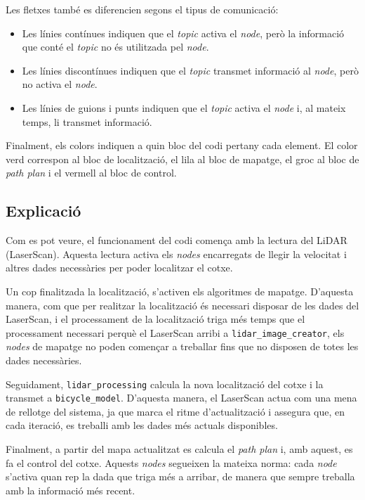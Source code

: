 \documentclass[11pt,a4paper]{article}
\begin{document}
Les fletxes també es diferencien segons el tipus de comunicació:
\nopagebreak

\begin{itemize}
  \item Les línies contínues indiquen que el \emph{topic} activa el \emph{node}, però la informació que conté el \emph{topic} no és utilitzada pel \emph{node}.
  \item Les línies discontínues indiquen que el \emph{topic} transmet informació al \emph{node}, però no activa el \emph{node}.
  \item Les línies de guions i punts indiquen que el \emph{topic} activa el \emph{node} i, al mateix temps, li transmet informació.
\end{itemize}

Finalment, els colors indiquen a quin bloc del codi pertany cada element. El color verd correspon al bloc de localització, el lila al bloc de mapatge, el groc al bloc de \emph{path plan} i el vermell al bloc de control.

\subsection{Explicació}

Com es pot veure, el funcionament del codi comença amb la lectura del LiDAR (LaserScan). Aquesta lectura activa els \emph{nodes} encarregats de llegir la velocitat i altres dades necessàries per poder localitzar el cotxe.

Un cop finalitzada la localització, s’activen els algoritmes de mapatge. D’aquesta manera, com que per realitzar la localització és necessari disposar de les dades del LaserScan, i el processament de la localització triga més temps que el processament necessari perquè el LaserScan arribi a \texttt{lidar\_\allowbreak{}image\_\allowbreak{}creator}, els \emph{nodes} de mapatge no poden començar a treballar fins que no disposen de totes les dades necessàries.

Seguidament, \texttt{lidar\_\allowbreak{}processing} calcula la nova localització del cotxe i la transmet a \texttt{bicycle\_\allowbreak{}model}. D’aquesta manera, el LaserScan actua com una mena de rellotge del sistema, ja que marca el ritme d’actualització i assegura que, en cada iteració, es treballi amb les dades més actuals disponibles.

Finalment, a partir del mapa actualitzat es calcula el \emph{path plan} i, amb aquest, es fa el control del cotxe. Aquests \emph{nodes} segueixen la mateixa norma: cada \emph{node} s’activa quan rep la dada que triga més a arribar, de manera que sempre treballa amb la informació més recent.
\end{document}
